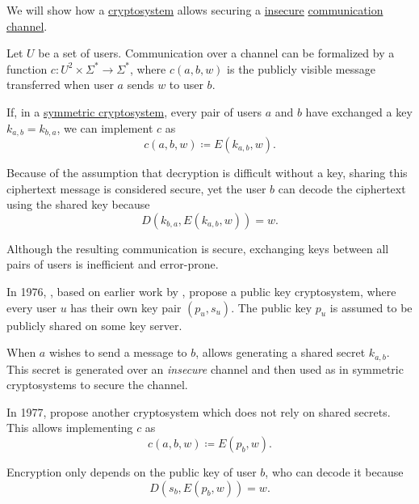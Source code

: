 \begin{remark}\label{rem:securing_communication_channels}
  We will show how a \hyperref[def:cryptosystem]{cryptosystem} allows securing a \hyperref[con:privacy]{insecure} \hyperref[con:communication_channel]{communication channel}.

  Let \( U \) be a set of users. Communication over a channel can be formalized by a function \( c: U^2 \times \Sigma^* \to \Sigma^* \), where \( c(a, b, w) \) is the publicly visible message transferred when user \( a \) sends \( w \) to user \( b \).

  \begin{thmenum}
     If, in a \hyperref[def:symmetric_cryptosystem]{symmetric cryptosystem}, every pair of users \( a \) and \( b \) have exchanged a key \( k_{a,b} = k_{b,a} \), we can implement \( c \) as
    \begin{equation*}
      c(a, b, w) \coloneqq E(k_{a,b}, w).
    \end{equation*}

    Because of the assumption that decryption is difficult without a key, sharing this ciphertext message is considered secure, yet the user \( b \) can decode the ciphertext using the shared key because
    \begin{equation*}
      D(k_{b,a}, E(k_{a,b}, w)) = w.
    \end{equation*}

    Although the resulting communication is secure, exchanging keys between all pairs of users is inefficient and error-prone.

     In 1976, \textcite{DiffieHellman1976NewDirectionsInCryptography}, based on earlier work by \textcite{Merkle1978SecureCommunications}, propose a public key cryptosystem, where every user \( u \) has their own key pair \( (p_u, s_u) \). The public key \( p_u \) is assumed to be publicly shared on some key server.

    When \( a \) wishes to send a message to \( b \),  allows generating a shared secret \( k_{a,b} \). This secret is generated over an \emph{insecure} channel and then used as in symmetric cryptosystems to secure the channel.

     In 1977, \textcite{RivestShamirAdleman1978RSA} propose another cryptosystem which does not rely on shared secrets. This allows implementing \( c \) as
    \begin{equation*}
      c(a, b, w) \coloneqq E(p_b, w).
    \end{equation*}

    Encryption only depends on the public key of user \( b \), who can decode it because
    \begin{equation*}
      D(s_b, E(p_b, w)) = w.
    \end{equation*}
  \end{thmenum}
\end{remark}


